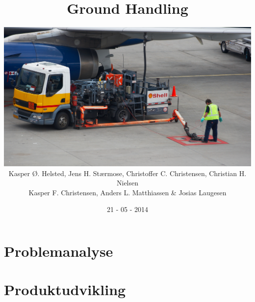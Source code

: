 \documentclass[12pt,a4paper]{report}
\title{Ground Handling}
\author{
    \includegraphics[width=14cm]{grafik/index} \\
        Kasper Ø. Helsted, Jens H. Stærmose, Christoffer C. Christensen, Christian H. Nielsen\\
        Kasper F. Christensen, Anders L. Matthiassen \& Josias Laugesen\\
}
\date{21 - 05 - 2014}
\begin{document}
    \maketitle
    \afterpage{\null\newpage}
    \clearpage  
    
    \afterpage{\null\newpage}
    \clearpage  
    
    \renewcommand*\contentsname{Indholdsfortegnelse}
    \tableofcontents
    \thispagestyle{empty}
    \clearpage
    \setcounter{page}{1}
	
    \part{Problemanalyse}

    
    
    
    
    

    \part{Produktudvikling}
    
    \printbibliography
\end{document}
